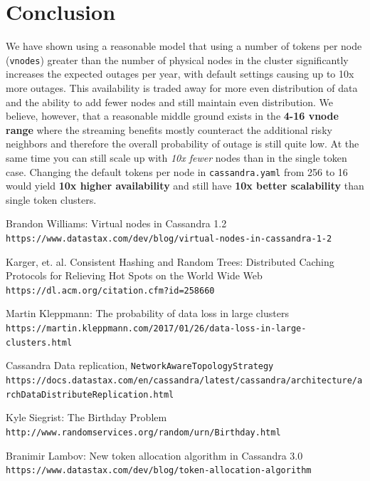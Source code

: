 \documentclass{article}
\begin{document}
\section{Conclusion}

We have shown using a reasonable model that using a number of tokens per node
(\texttt{vnodes}) greater than the number of physical nodes in the cluster
significantly increases the expected outages per year, with default settings
causing up to 10x more outages. This availability is traded away for more even
distribution of data and the ability to add fewer nodes and still maintain even
distribution. We believe, however, that a reasonable middle ground exists in
the \textbf{4-16 vnode range} where the streaming benefits mostly counteract
the additional risky neighbors and therefore the overall probability of outage
is still quite low. At the same time you can still scale up with \textit{10x
fewer} nodes than in the single token case. Changing the default tokens per
node in \texttt{cassandra.yaml} from 256 to 16 would yield \textbf{10x higher
availability} and still have \textbf{10x better scalability} than single token
clusters.

\begin{thebibliography}{9}

Brandon Williams: Virtual nodes in Cassandra 1.2
\\\texttt{https://www.datastax.com/dev/blog/virtual-nodes-in-cassandra-1-2}

Karger, et. al. Consistent Hashing and Random Trees: Distributed Caching Protocols for Relieving Hot Spots on the World Wide Web
\\\texttt{https://dl.acm.org/citation.cfm?id=258660}

Martin Kleppmann: The probability of data loss in large clusters
\\\texttt{https://martin.kleppmann.com/2017/01/26/data-loss-in-large-clusters.html}

Cassandra Data replication, \texttt{NetworkAwareTopologyStrategy}
\texttt{https://docs.datastax.com/en/cassandra/latest/cassandra/architecture/archDataDistributeReplication.html}

Kyle Siegrist: The Birthday Problem
\\\texttt{http://www.randomservices.org/random/urn/Birthday.html}

Branimir Lambov: New token allocation algorithm in Cassandra 3.0
\\\texttt{https://www.datastax.com/dev/blog/token-allocation-algorithm}



\end{thebibliography}
\end{document}
